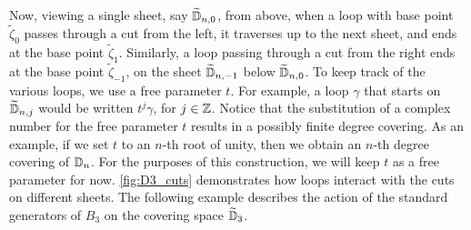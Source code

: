 Now, viewing a single sheet, say $\widetilde{\mathbb{D}}_{n,0}$, from above, when a loop with base point $\tilde{\zeta}_0$ passes through a cut from the left, it traverses up to the next sheet, and ends at the base point $\tilde{\zeta}_1$. Similarly, a loop passing through a cut from the right ends at the base point $\tilde{\zeta}_{-1}$, on the sheet $\widetilde{\mathbb{D}}_{n,-1}$ below $\widetilde{\mathbb{D}}_{n,0}$. To keep track of the various loops, we use a free parameter $t$. For example, a loop $\gamma$ that starts on $\widetilde{\mathbb{D}}_{n,j}$ would be written $t^j \gamma$, for $j\in\mathbb{Z}$. Notice that the substitution of a complex number for the free parameter $t$ results in a possibly finite degree covering. As an example, if we set $t$ to an $n$-th root of unity, then we obtain an $n$-th degree covering of $\mathbb{D}_n$. For the purposes of this construction, we will keep $t$ as a free parameter for now.{ }\cref{fig:D3_cuts} demonstrates how loops interact with the cuts on different sheets. The following example describes the action of the standard generators of $B_3$ on the covering space $\widetilde{\mathbb{D}}_3$.


